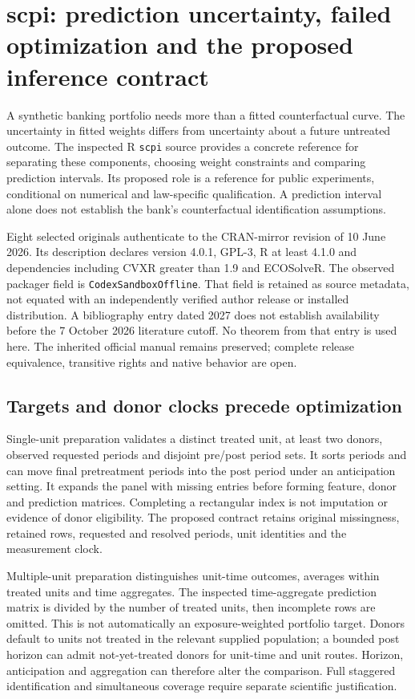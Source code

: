 \section{scpi: prediction uncertainty, failed optimization and the proposed inference contract}
\label{sec:exec24-scpi-reuse}

A synthetic banking portfolio needs more than a fitted counterfactual curve.
The uncertainty in fitted weights differs from uncertainty about a future
untreated outcome. The inspected R \texttt{scpi} source provides a concrete
reference for separating these components, choosing weight constraints and
comparing prediction intervals. Its proposed role is a reference for public
experiments, conditional on numerical and law-specific qualification. A
prediction interval alone does not establish the bank's counterfactual
identification assumptions.~\citep{exec24_scpi_choice}

Eight selected originals authenticate to the CRAN-mirror revision of 10 June
2026. Its description declares version 4.0.1, GPL-3, R at least 4.1.0 and
dependencies including CVXR greater than 1.9 and ECOSolveR. The observed
packager field is \texttt{CodexSandboxOffline}. That field is retained as
source metadata, not equated with an independently verified author release
or installed distribution. A bibliography entry dated 2027 does not establish
availability before the 7 October 2026 literature cutoff. No theorem from
that entry is used here. The inherited official manual remains preserved;
complete release equivalence, transitive rights and native behavior are open.
\citep{exec24_scpi_source,v12_sw_scpi}

\subsection{Targets and donor clocks precede optimization}
Single-unit preparation validates a distinct treated unit, at least two
donors, observed requested periods and disjoint pre/post period sets. It sorts
periods and can move final pretreatment periods into the post period under
an anticipation setting. It expands the panel with missing entries before
forming feature, donor and prediction matrices. Completing a rectangular
index is not imputation or evidence of donor eligibility. The proposed
contract retains original missingness, retained rows, requested and resolved
periods, unit identities and the measurement clock.
\citep{exec24_scpi_source}

Multiple-unit preparation distinguishes unit-time outcomes, averages within
treated units and time aggregates. The inspected time-aggregate prediction
matrix is divided by the number of treated units, then incomplete rows are
omitted. This is not automatically an exposure-weighted portfolio target.
Donors default to units not treated in the relevant supplied population;
a bounded post horizon can admit not-yet-treated donors for unit-time and
unit routes. Horizon, anticipation and aggregation can therefore alter the
comparison. Full staggered identification and simultaneous coverage require
separate scientific justification.~\citep{exec24_scpi_source,exec24_scpi_choice}

